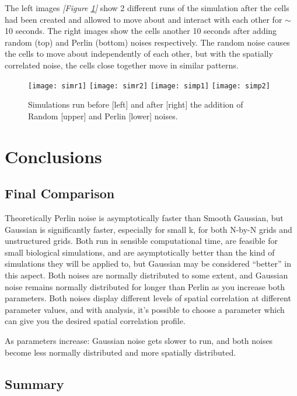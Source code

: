 \documentclass[11pt,a4paper]{article}
\begin{document}
The left images \emph{[Figure \ref{fig:sim}]} show 2 different runs of the simulation after the cells had been created and allowed to move about and interact with each other for $\sim$10 seconds. The right images show the cells another 10 seconds after adding random (top) and Perlin (bottom) noises respectively. The random noise causes the cells to move about independently of each other, but with the spatially correlated noise, the cells close together move in similar patterns.


\begin{figure}[h]
	\centering 
	\texttt{[image: simr1]}
	\texttt{[image: simr2]}
	\texttt{[image: simp1]}
	\texttt{[image: simp2]}
	\caption{Simulations run before [left] and after [right] the addition of Random [upper] and Perlin [lower] noises.}
	\label{fig:sim}
\end{figure}

\section{Conclusions}

\subsection{Final Comparison}

Theoretically Perlin noise is asymptotically faster than Smooth Gaussian, but Gaussian is significantly faster, especially for small k, for both N-by-N grids and unstructured grids. Both run in sensible computational time, are feasible for small biological simulations, and are asymptotically better than the kind of simulations they will be applied to, but Gaussian may be considered “better” in this aspect. 
Both noises are normally distributed to some extent, and Gaussian noise remains normally distributed for longer than Perlin as you increase both parameters. Both noises display different levels of spatial correlation at different parameter values, and with analysis, it’s possible to choose a parameter which can give you the desired spatial correlation profile.

As parameters increase: Gaussian noise gets slower to run, and both noises become less normally distributed and more spatially distributed.

\subsection{Summary}
\end{document}
